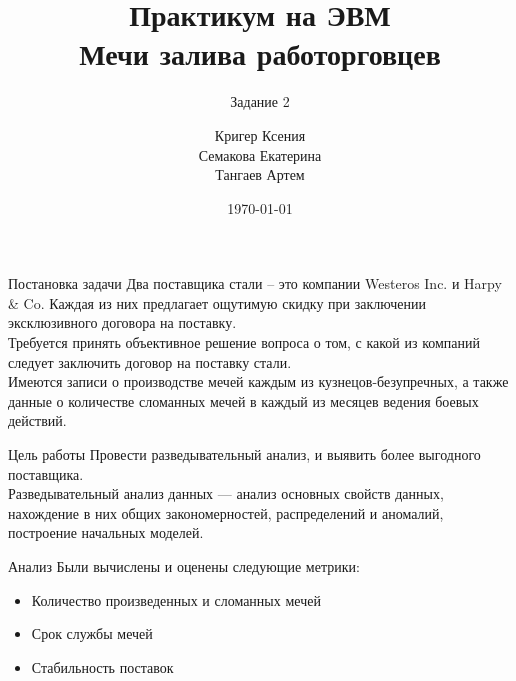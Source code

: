 \documentclass{beamer}
\title{Практикум на ЭВМ\\ Мечи залива работорговцев}
\subtitle{Задание 2}
\author{Кригер Ксения \\ Семакова Екатерина \\ Тангаев Артем}
\institute{МГУ ВМК \\ Исследование Операций}
\date{\today}
\begin{document}
    \scriptsize
    
    \begin{frame}
        \maketitle
    \end{frame}
    
    \begin{frame}{Постановка задачи}
        Два поставщика стали -- это компании {Westeros Inc.} и {Harpy \& Co}. Каждая из них предлагает ощутимую скидку при заключении эксклюзивного договора на поставку.\\
        Требуется принять объективное решение вопроса о том, с какой из компаний следует заключить договор на поставку стали.\\
        Имеются записи о производстве мечей каждым из кузнецов-безупречных, а также данные о количестве сломанных мечей в каждый из месяцев ведения боевых действий.\\
    \end{frame}
    
    \begin{frame}{Цель работы}
        Провести разведывательный анализ, и выявить более выгодного поставщика.\\
        \vspace{0.5cm}
        Разведывательный анализ данных — анализ основных свойств данных, нахождение в них общих закономерностей, распределений и аномалий, построение начальных моделей. \\
    \end{frame}
    
    \begin{frame}{Анализ}
        Были вычислены и оценены следующие метрики:\\
        \begin{itemize}
            \item Количество произведенных и сломанных мечей
            \item Срок службы мечей
            \item Стабильность поставок
        \end{itemize}
    \end{frame}
    
\end{document}
